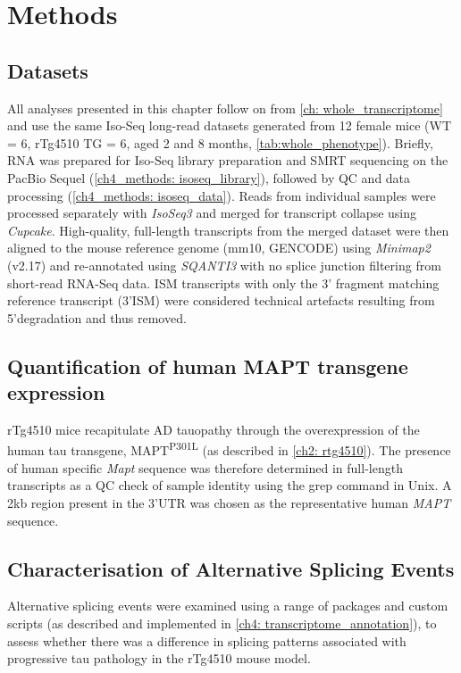 \newpage
\section{Methods}

\subsection{Datasets}
All analyses presented in this chapter follow on from \cref{ch: whole_transcriptome} and use the same Iso-Seq long-read datasets generated from 12 female mice (WT = 6, rTg4510 TG = 6, aged 2 and 8 months, \cref{tab:whole_phenotype}). Briefly, RNA was prepared for Iso-Seq library preparation and SMRT sequencing on the PacBio Sequel (\cref{ch4_methods: isoseq_library}), followed by QC and data processing (\cref{ch4_methods: isoseq_data}). Reads from individual samples were processed separately with \textit{IsoSeq3} and merged for transcript collapse using \textit{Cupcake}. High-quality, full-length transcripts from the merged dataset were then aligned to the mouse reference genome (mm10, GENCODE) using \textit{Minimap2} (v2.17) and re-annotated using \textit{SQANTI3} with no splice junction filtering from short-read RNA-Seq data. ISM transcripts with only the 3' fragment matching reference transcript (3'ISM) were considered technical artefacts resulting from 5'degradation and thus removed.  

\subsection{Quantification of human MAPT transgene expression}
\label{ch5: hmapt_quant}
rTg4510 mice recapitulate AD tauopathy through the overexpression of the human tau transgene, MAPT\textsuperscript{P301L} (as described in \cref{ch2: rtg4510}). The presence of human specific \textit{Mapt} sequence was therefore determined in full-length transcripts as a QC check of sample identity using the grep command in Unix. A 2kb region present in the 3'UTR was chosen as the representative human \textit{MAPT} sequence\cite{Castanho2020}.

\subsection{Characterisation of Alternative Splicing Events} 
Alternative splicing events were examined using a range of packages and custom scripts (as described and implemented in \cref{ch4: transcriptome_annotation}), to assess whether there was a difference in splicing patterns associated with progressive tau pathology in the rTg4510 mouse model. 

